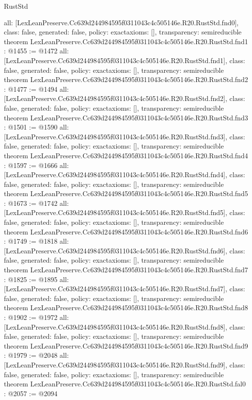 \begin{lexlean}{RustStd}
\begin{coremodule}
{  all: [LexLeanPreserve.Cc639d244984595f0311043c4c505146e.R20.RustStd.fnd0],
  class: false,
  generated: false,
  policy: exact{axioms: []},
  transparency: semireducible
}
theorem LexLeanPreserve.Cc639d244984595f0311043c4c505146e.R20.RustStd.fnd1 : @1455 := @1472 {
  all: [LexLeanPreserve.Cc639d244984595f0311043c4c505146e.R20.RustStd.fnd1],
  class: false,
  generated: false,
  policy: exact{axioms: []},
  transparency: semireducible
}
theorem LexLeanPreserve.Cc639d244984595f0311043c4c505146e.R20.RustStd.fnd2 : @1477 := @1494 {
  all: [LexLeanPreserve.Cc639d244984595f0311043c4c505146e.R20.RustStd.fnd2],
  class: false,
  generated: false,
  policy: exact{axioms: []},
  transparency: semireducible
}
theorem LexLeanPreserve.Cc639d244984595f0311043c4c505146e.R20.RustStd.fnd3 : @1501 := @1590 {
  all: [LexLeanPreserve.Cc639d244984595f0311043c4c505146e.R20.RustStd.fnd3],
  class: false,
  generated: false,
  policy: exact{axioms: []},
  transparency: semireducible
}
theorem LexLeanPreserve.Cc639d244984595f0311043c4c505146e.R20.RustStd.fnd4 : @1597 := @1666 {
  all: [LexLeanPreserve.Cc639d244984595f0311043c4c505146e.R20.RustStd.fnd4],
  class: false,
  generated: false,
  policy: exact{axioms: []},
  transparency: semireducible
}
theorem LexLeanPreserve.Cc639d244984595f0311043c4c505146e.R20.RustStd.fnd5 : @1673 := @1742 {
  all: [LexLeanPreserve.Cc639d244984595f0311043c4c505146e.R20.RustStd.fnd5],
  class: false,
  generated: false,
  policy: exact{axioms: []},
  transparency: semireducible
}
theorem LexLeanPreserve.Cc639d244984595f0311043c4c505146e.R20.RustStd.fnd6 : @1749 := @1818 {
  all: [LexLeanPreserve.Cc639d244984595f0311043c4c505146e.R20.RustStd.fnd6],
  class: false,
  generated: false,
  policy: exact{axioms: []},
  transparency: semireducible
}
theorem LexLeanPreserve.Cc639d244984595f0311043c4c505146e.R20.RustStd.fnd7 : @1825 := @1895 {
  all: [LexLeanPreserve.Cc639d244984595f0311043c4c505146e.R20.RustStd.fnd7],
  class: false,
  generated: false,
  policy: exact{axioms: []},
  transparency: semireducible
}
theorem LexLeanPreserve.Cc639d244984595f0311043c4c505146e.R20.RustStd.fnd8 : @1902 := @1972 {
  all: [LexLeanPreserve.Cc639d244984595f0311043c4c505146e.R20.RustStd.fnd8],
  class: false,
  generated: false,
  policy: exact{axioms: []},
  transparency: semireducible
}
theorem LexLeanPreserve.Cc639d244984595f0311043c4c505146e.R20.RustStd.fnd9 : @1979 := @2048 {
  all: [LexLeanPreserve.Cc639d244984595f0311043c4c505146e.R20.RustStd.fnd9],
  class: false,
  generated: false,
  policy: exact{axioms: []},
  transparency: semireducible
}
theorem LexLeanPreserve.Cc639d244984595f0311043c4c505146e.R20.RustStd.fal0 : @2057 := @2094 {
}
\end{coremodule}
\end{lexlean}
